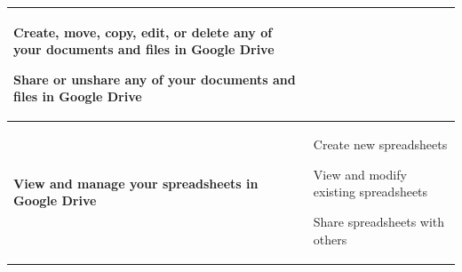 \begin{table}[H]
\begin{center}
\begin{tabular}{ | p{5cm} | p{8cm} | }
\begin{compactitem}
		\item Create, move, copy, edit, or delete any of your documents and files in Google Drive
		\item Share or unshare any of your documents and files in Google Drive
	\end{compactitem} \\ \hline
	\textbf{View and manage your spreadsheets in Google Drive} &
	\begin{compactitem}
		\item Create new spreadsheets
		\item View and modify existing spreadsheets
		\item Share spreadsheets with others
	\end{compactitem} \\ \hline	
    \end{tabular}
\end{center}
\end{table}